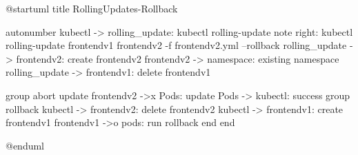 @startuml
title RollingUpdates-Rollback

autonumber
kubectl -> rolling_update: kubectl rolling-update
note right: kubectl rolling-update frontendv1 frontendv2 -f frontendv2.yml --rollback
rolling_update -> frontendv2: create frontendv2
frontendv2 -> namespace: existing namespace
rolling_update -> frontendv1: delete frontendv1

group abort update
  frontendv2 ->x Pods: update
  Pods -> kubectl: success
  group rollback
    kubectl -> frontendv2: delete frontendv2
    kubectl -> frontendv1: create frontendv1
    frontendv1 ->o pods: run rollback
    end
end

@enduml
